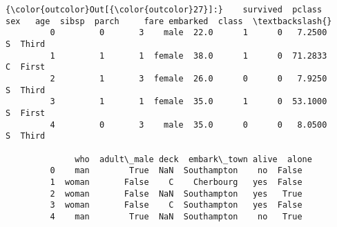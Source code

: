 \documentclass[11pt]{article}
\begin{document}
\begin{Verbatim}[commandchars=\\\{\}]
{\color{outcolor}Out[{\color{outcolor}27}]:}    survived  pclass     sex   age  sibsp  parch     fare embarked  class  \textbackslash{}
         0         0       3    male  22.0      1      0   7.2500        S  Third   
         1         1       1  female  38.0      1      0  71.2833        C  First   
         2         1       3  female  26.0      0      0   7.9250        S  Third   
         3         1       1  female  35.0      1      0  53.1000        S  First   
         4         0       3    male  35.0      0      0   8.0500        S  Third   
         
              who  adult\_male deck  embark\_town alive  alone  
         0    man        True  NaN  Southampton    no  False  
         1  woman       False    C    Cherbourg   yes  False  
         2  woman       False  NaN  Southampton   yes   True  
         3  woman       False    C  Southampton   yes  False  
         4    man        True  NaN  Southampton    no   True  
\end{Verbatim}
            

    
    
    
    
\end{document}

